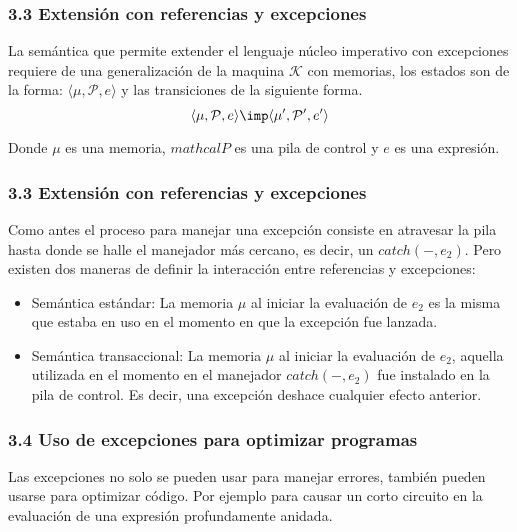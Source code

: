 \documentclass[xcolor=dvipsnames,table,spanish]{beamer}
\begin{document}
\begin{frame}
\frametitle{3.3 Extensión con referencias y excepciones}
La semántica que permite extender el lenguaje núcleo imperativo con excepciones requiere de una generalización de la maquina $\mathcal{K}$ con memorias, los estados son de la forma: $\langle \mu , \mathcal{P} , e \rangle$ y las transiciones de la siguiente forma.
\[\langle \mu , \mathcal{P} , e \rangle \imp \langle \mu ', \mathcal{P}' , e' \rangle\]

Donde $\mu$ es una memoria, $mathcal{P}$ es una pila de control y $e$ es una expresión.
\end{frame}
\begin{frame}
\frametitle{3.3 Extensión con referencias y excepciones}
Como antes el proceso para manejar una excepción consiste en atravesar la pila hasta donde se halle el manejador más cercano, es decir, un $catch(-,e_2)$. Pero existen dos maneras de definir la interacción entre referencias y excepciones:

\begin{itemize}
\item Semántica estándar: La memoria $\mu$ al iniciar la evaluación de $e_2$ es la misma que estaba en uso en el momento en que la excepción fue lanzada.
\item Semántica transaccional: La memoria $\mu$ al iniciar la evaluación de $e_2$, aquella utilizada en el momento en el manejador $catch(-,e_2)$ fue instalado en la pila de control. Es decir, una excepción deshace cualquier efecto anterior.
\end{itemize}
\end{frame}
\begin{frame}
\frametitle{3.4 Uso de excepciones para optimizar programas}
Las excepciones no solo se pueden usar para manejar errores, también pueden usarse para optimizar código. Por ejemplo para causar un corto circuito en la evaluación de una expresión profundamente anidada.

\end{frame}
\end{document}
